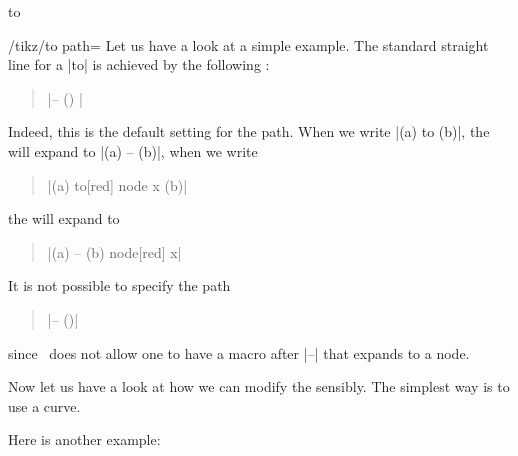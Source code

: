 \begin{pathoperation}{to}{
         }
\begin{key}{/tikz/to path=}
        Let us have a look at a simple example. The standard straight line for
        a |to| is achieved by the following :
        \begin{quote}
            |-- (\tikztotarget) \tikztonodes|
        \end{quote}

        Indeed, this is the default setting for the path. When we write
        |(a) to (b)|, the  will expand to |(a) -- (b)|, when we
        write
        \begin{quote}
            |(a) to[red] node {x} (b)|
        \end{quote}
        the  will expand to
        \begin{quote}
            |(a) -- (b) node[red] {x}|
        \end{quote}

        It is not possible to specify the path
        \begin{quote}
            |-- \tikztonodes (\tikztotarget)|
        \end{quote}
        since \tikzname\ does not allow one to have a macro after |--| that
        expands to a node.

        Now let us have a look at how we can modify the  sensibly.
        The simplest way is to use a curve.
\begin{codeexample}[]
\end{codeexample}

        Here is another example:
\begin{codeexample}[]

\end{codeexample}


\end{key}
\end{pathoperation}
